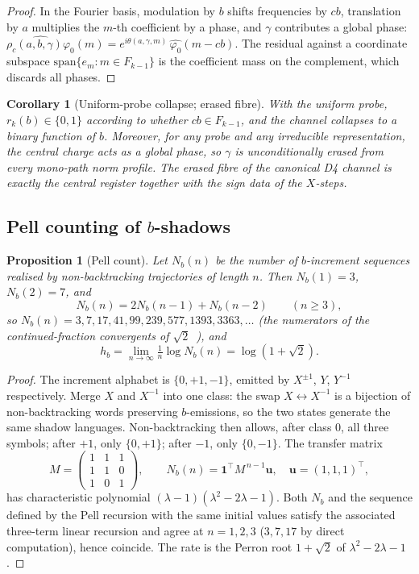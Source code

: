 \documentclass[11pt]{article}
\newtheorem{proposition}{Proposition}
\newtheorem{corollary}{Corollary}
\newcommand{\Nb}{N_b}
\newcommand{\hb}{h_b}
\begin{document}
\begin{proof}
In the Fourier basis, modulation by $b$ shifts frequencies by $cb$, translation by $a$ multiplies the $m$-th
coefficient by a phase, and $\gamma$ contributes a global phase:
$\widehat{\rho_c(a,b,\gamma)\varphi_0}(m) = e^{i\theta(a,\gamma,m)}\,\widehat{\varphi_0}(m-cb)$.
The residual against a coordinate subspace $\mathrm{span}\{e_m:m\in F_{k-1}\}$ is the coefficient mass on the
complement, which discards all phases.
\end{proof}

\begin{corollary}[Uniform-probe collapse; erased fibre]
\label{cor:uniform-collapse}
With the uniform probe, $r_k(b)\in\{0,1\}$ according to whether $cb\in F_{k-1}$, and the channel collapses to
a binary function of $b$.
Moreover, for any probe and any irreducible representation, the central charge acts as a global phase, so
$\gamma$ is unconditionally erased from every mono-path norm profile.
The erased fibre of the canonical D4 channel is exactly the central register together with the sign data of
the $X$-steps.
\end{corollary}

\subsection{Pell counting of $b$-shadows}
\label{sec:pell}

\begin{proposition}[Pell count]
\label{prop:pell}
Let $\Nb(n)$ be the number of $b$-increment sequences realised by non-backtracking trajectories of length
$n$.
Then $\Nb(1)=3$, $\Nb(2)=7$, and
\[
\Nb(n)=2\Nb(n-1)+\Nb(n-2) \qquad (n\ge 3),
\]
so $\Nb(n)=3,7,17,41,99,239,577,1393,3363,\dots$ (the numerators of the continued-fraction convergents of
$\sqrt2$~\cite{NSW1981}), and
\[
\hb=\lim_{n\to\infty}\tfrac1n\log\Nb(n)=\log(1+\sqrt2).
\]
\end{proposition}

\begin{proof}
The increment alphabet is $\{0,+1,-1\}$, emitted by $X^{\pm1}$, $Y$, $Y^{-1}$ respectively.
Merge $X$ and $X^{-1}$ into one class: the swap $X\leftrightarrow X^{-1}$ is a bijection of non-backtracking
words preserving $b$-emissions, so the two states generate the same shadow languages.
Non-backtracking then allows, after class $0$, all three symbols; after $+1$, only $\{0,+1\}$; after $-1$,
only $\{0,-1\}$.
The transfer matrix
\[
M=\begin{pmatrix}1&1&1\\ 1&1&0\\ 1&0&1\end{pmatrix},
\qquad
\Nb(n)=\mathbf{1}^{\!\top} M^{\,n-1}\mathbf{u},\quad \mathbf{u}=(1,1,1)^{\!\top},
\]
has characteristic polynomial $(\lambda-1)(\lambda^2-2\lambda-1)$.
Both $\Nb$ and the sequence defined by the Pell recursion with the same initial values satisfy the associated
three-term linear recursion and agree at $n=1,2,3$ ($3,7,17$ by direct computation), hence coincide.
The rate is the Perron root $1+\sqrt2$ of $\lambda^2-2\lambda-1$.
\end{proof}
\end{document}
